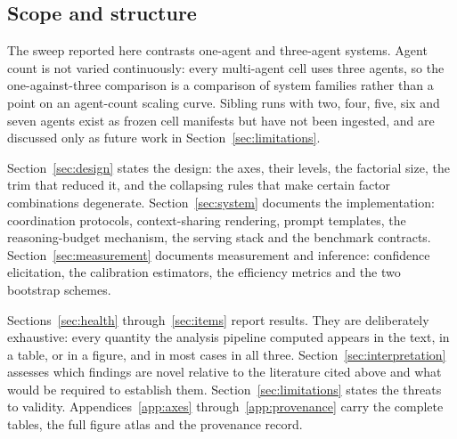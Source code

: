 \subsection{Scope and structure}

The sweep reported here contrasts one-agent and three-agent systems. Agent count is not
varied continuously: every multi-agent cell uses three agents, so the one-against-three
comparison is a comparison of system families rather than a point on an agent-count
scaling curve. Sibling runs with two, four, five, six and seven agents exist as frozen
cell manifests but have not been ingested, and are discussed only as future work in
Section~\ref{sec:limitations}.

Section~\ref{sec:design} states the design: the axes, their levels, the factorial size,
the trim that reduced it, and the collapsing rules that make certain factor combinations
degenerate. Section~\ref{sec:system} documents the implementation: coordination
protocols, context-sharing rendering, prompt templates, the reasoning-budget mechanism,
the serving stack and the benchmark contracts. Section~\ref{sec:measurement} documents
measurement and inference: confidence elicitation, the calibration estimators, the
efficiency metrics and the two bootstrap schemes.

Sections~\ref{sec:health} through~\ref{sec:items} report results. They are deliberately
exhaustive: every quantity the analysis pipeline computed appears in the text, in a
table, or in a figure, and in most cases in all three. Section~\ref{sec:interpretation}
assesses which findings are novel relative to the literature cited above and what would
be required to establish them. Section~\ref{sec:limitations} states the threats to
validity. Appendices~\ref{app:axes} through~\ref{app:provenance} carry the complete
tables, the full figure atlas and the provenance record.
